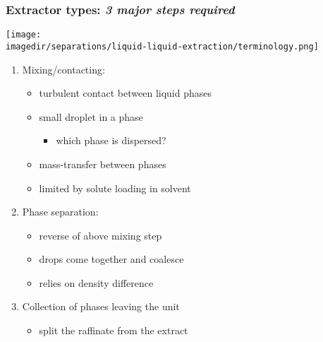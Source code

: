 \begin{frame}\frametitle{Extractor types: \emph{3 major steps required}}
	\begin{center}
		\texttt{[image: \\imagedir/separations/liquid-liquid-extraction/terminology.png]}
	\end{center}
	\begin{enumerate}
		\item	Mixing/contacting:
		 	\begin{itemize}
		 		\item	turbulent contact between liquid phases
		 		\item	small droplet {\color{purple}{dispersion}} in a {\color{purple}{continuous}} phase
				\begin{itemize}
					\item	which phase is dispersed?
				\end{itemize}
		 		\item	mass-transfer between phases
		 		\item	limited by solute loading in solvent
		 	\end{itemize}
		\item	Phase separation: 
			\begin{itemize}
				\item	reverse of above mixing step
				\item	drops come together and coalesce
				\item	relies on density difference
			\end{itemize}
		\item	Collection of phases leaving the unit
			\begin{itemize}
				\item	split the raffinate from the extract
			\end{itemize}
	\end{enumerate}
\end{frame}

